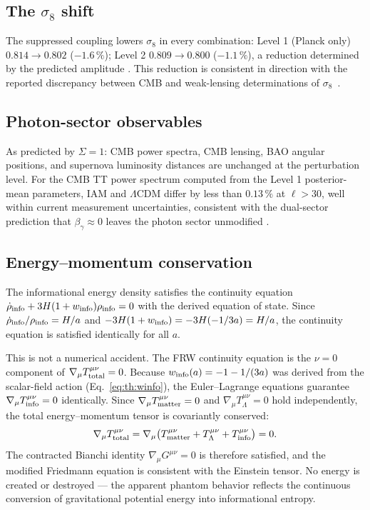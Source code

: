 \subsection{The $\sigma_8$ shift}
The suppressed coupling lowers $\sigma_8$ in every combination: Level 1 (Planck only) $0.814\to0.802$ ($-1.6\,\%$); Level 2 $0.809\to0.800$
($-1.1\,\%$), a reduction determined by the predicted amplitude \measured. This reduction is consistent in direction with the reported discrepancy
between CMB and weak-lensing determinations of $\sigma_8$~\cite{Heymans2021,AbbottDESY3_2022}.

\subsection{Photon-sector observables}
As predicted by $\Sigma=1$: CMB power spectra, CMB lensing, BAO angular positions, and supernova luminosity distances are unchanged at the perturbation
level. For the CMB TT power spectrum computed from the Level 1 posterior-mean parameters, IAM and $\Lambda$CDM differ by less than $0.13\,\%$ at $\ell>30$,
well within current measurement uncertainties, consistent with the dual-sector prediction that $\beta_\gamma\approx0$ leaves the photon sector
unmodified \calc.

\subsection{Energy--momentum conservation}
The informational energy density satisfies the continuity equation $\dot\rho_{\rm info}+3H(1+w_{\rm info})\rho_{\rm info}=0$ with the derived equation of state.
Since $\dot\rho_{\rm info}/\rho_{\rm info}=H/a$ and $-3H(1+w_{\rm info})=-3H(-1/3a)=H/a$, the continuity equation is satisfied identically for all $a$. \derived

This is not a numerical accident. The FRW continuity equation is the $\nu=0$ component of $\nabla_\mu T^{\mu\nu}_{\rm total}=0$. Because
$w_{\rm info}(a)=-1-1/(3a)$ was derived from the scalar-field action (Eq.~\eqref{eq:th:winfo}), the Euler--Lagrange equations guarantee
$\nabla_\mu T^{\mu\nu}_{\rm info}=0$ identically. Since $\nabla_\mu T^{\mu\nu}_{\rm matter}=0$ and $\nabla_\mu T^{\mu\nu}_\Lambda=0$ hold independently, the
total energy--momentum tensor is covariantly conserved:
\begin{equation}\nabla_\mu T^{\mu\nu}_{\rm total}=\nabla_\mu\big(T^{\mu\nu}_{\rm matter}+T^{\mu\nu}_\Lambda+T^{\mu\nu}_{\rm info}\big)=0 .\label{eq:th:conservation}\end{equation}
The contracted Bianchi identity $\nabla_\mu G^{\mu\nu}=0$ is therefore satisfied, and the modified Friedmann equation is consistent with the Einstein
tensor. No energy is created or destroyed --- the apparent phantom behavior reflects the continuous conversion of gravitational potential energy into
informational entropy. \interp

